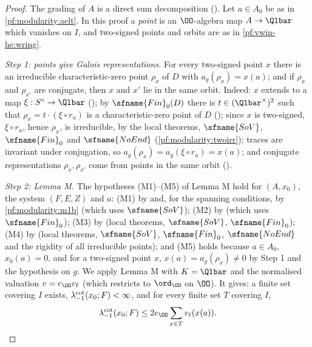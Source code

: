 \begin{proof}
The grading of $A$ is a direct sum decomposition ().
Let $a\in A_0$ be as in \cref{pf:modularity:aelt}. In this proof a \emph{point} is an $\OO$-algebra map $A\to\Qlbar$ which
vanishes on $I$, and two-signed points and orbits are as in \cref{pf:vwin-he:wring}.

\emph{Step 1: points give Galois representations.} For every two-signed point $x$ there is an irreducible
characteristic-zero point $\rho_x$ of $D$ with $a_g(\rho_x)=x(a)$; and if $\rho_x$ and $\rho_{x'}$ are conjugate, then $x$
and $x'$ lie in the same orbit. Indeed: $x$ extends to a map
$\xi:S^\circ\to\Qlbar$ (); by $\sfname{Fin}_0(D)$ there is
$t\in(\Qlbar^\times)^2$ such that $\rho_x=t\cdot(\xi\circ r_u)$ is a characteristic-zero point of $D$
(); since $x$ is two-signed, $\xi\circ r_u$, hence
$\rho_x$, is irreducible, by the local theorems, $\sfname{SoV}$, $\sfname{Fin}_0$ and $\sfname{NoEnd}$
(\cref{pf:modularity:twoirr}); traces are invariant under conjugation, so
$a_g(\rho_x)=a_g(\xi\circ r_u)=x(a)$; and conjugate representations $\rho_x,\rho_{x'}$ come from points in the same
orbit ().

\emph{Step 2: Lemma M.} The hypotheses (M1)--(M5) of Lemma M hold for $(A,x_0)$, the system $(F,E,Z)$ and $a$:
(M1) by  and, for the spanning conditions, by
\cref{pf:modularity:m1b} (which uses $\sfname{SoV}$); (M2) by
 (which uses $\sfname{Fin}_0$); (M3) by
 (local theorems, $\sfname{SoV}$, $\sfname{Fin}_0$); (M4) by
 (local theorems, $\sfname{SoV}$, $\sfname{Fin}_0$,
$\sfname{NoEnd}$ and the rigidity of all irreducible points); and (M5) holds because $a\in A_0$, $x_0(a)=0$, and for a
two-signed point $x$, $x(a)=a_g(\rho_x)\ne0$ by Step 1 and the hypothesis on $g$. We apply Lemma M with $K=\Qlbar$ and
the normalised valuation $v=e_\OO v_\ell$ (which restricts to $\ord_\OO$ on $\OO$). It gives: a finite set covering $I$
exists, $\lambda^{\mathrm{cot}}_{-1}(x_0;F)<\infty$, and for every finite set $T$ covering $I$,
\begin{equation}\label{pf:modularity:LM}
\modularitycot_{-1}(x_0;F)\le2e_\OO\sum_{x\in T}v_\ell(x(a)).
\end{equation}


\end{proof}
